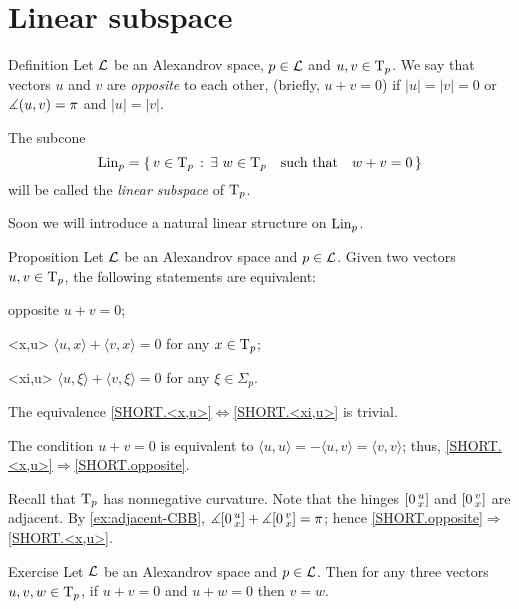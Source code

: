 \section{Linear subspace}

\begin{thm}{Definition}\label{def:opp+Lin}
Let $\mathcal{L}$ be an Alexandrov space, $p\in \mathcal{L}$ and $u,v\in\mathrm{T}_p$.
We say that vectors $u$ and $v$ are \emph{opposite}\label{def:opposite:page} to each other, (briefly, $u+v=0$) if $|u|=|v|=0$ or $\measuredangle(u,v)=\pi$ and $|u|=|v|$.

The subcone
\[\mathop{\rm Lin}\nolimits_p=\left\{\,{v\in\mathrm{T}_p}\,:\,{\exists\ w\in\mathrm{T}_p\quad \text{such that}\quad w+v=0}\,\right\}\]
will be called the \emph{linear subspace} of $\mathrm{T}_p$.
\end{thm}

Soon we will introduce a natural linear structure on $\mathop{\rm Lin}\nolimits_p$.

\begin{thm}{Proposition}\label{prop:opposite}
Let $\mathcal{L}$ be an Alexandrov space and $p\in \mathcal{L}$.
Given two vectors $u,v\in\mathrm{T}_p$, the following statements are equivalent:
\begin{subthm}{opposite} $u+v=0$;
\end{subthm}
\begin{subthm}{<x,u>} $\langle u,x\rangle +\langle v,x\rangle =0$ for any $x\in\mathrm{T}_p$;
\end{subthm}
\begin{subthm}{<xi,u>} $\langle u,\xi\rangle +\langle v,\xi\rangle =0$ for any $\xi\in\Sigma_p$.
\end{subthm}
\end{thm}

The equivalence  \ref{SHORT.<x,u>}$\Leftrightarrow$\ref{SHORT.<xi,u>} is trivial.

The condition $u+v=0$ is equivalent to 
$\langle u,u\rangle =-\langle u,v\rangle =\langle v,v\rangle$;
thus,
\ref{SHORT.<x,u>}$\Rightarrow$\ref{SHORT.opposite}.

Recall that $\mathrm{T}_p$ has nonnegative curvature.
Note that the hinges $[0\,{}^{u}_{x}]$ and $[0\,{}^{v}_{x}]$ are adjacent.
By \ref{ex:adjacent-CBB}, $\measuredangle[0\,{}^{u}_{x}]+\measuredangle[0\,{}^{v}_{x}]=\pi$;
hence \ref{SHORT.opposite}$\Rightarrow$\ref{SHORT.<x,u>}.
\qeds

\begin{thm}{Exercise}\label{prop:two-opp}
Let $\mathcal{L}$  be an Alexandrov space and $p\in \mathcal{L}$.
Then for any three vectors $u,v,w\in\mathrm{T}_p$, if $u+v=0$ and $u+ w=0$ then $v=w$.
\end{thm}


